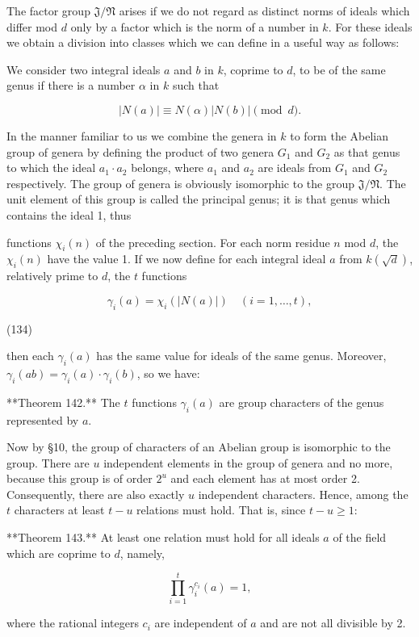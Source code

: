 The factor group $\mathfrak{J}/\mathfrak{N}$ arises if we do not regard as distinct norms of ideals which differ mod $d$ only by a factor which is the norm of a number in $k$. For these ideals we obtain a division into classes which we can define in a useful way as follows:

We consider two integral ideals $a$ and $b$ in $k$, coprime to $d$, to be of the same genus if there is a number $\alpha$ in $k$ such that

$$|N(a)| \equiv N(\alpha)|N(b)| \pmod{d}.$$

In the manner familiar to us we combine the genera in $k$ to form the Abelian group of genera by defining the product of two genera $G_1$ and $G_2$ as that genus to which the ideal $a_1 \cdot a_2$ belongs, where $a_1$ and $a_2$ are ideals from $G_1$ and $G_2$ respectively. The group of genera is obviously isomorphic to the group $\mathfrak{J}/\mathfrak{N}$. The unit element of this group is called the principal genus; it is that genus which contains the ideal 1, thus

functions $\chi_i(n)$ of the preceding section. For each norm residue $n$ mod $d$, the $\chi_i(n)$ have the value 1. If we now define for each integral ideal $a$ from $k(\sqrt{d})$, relatively prime to $d$, the $t$ functions

$$\gamma_i(a) = \chi_i(|N(a)|) \quad (i = 1, \ldots, t),$$

(134)

then each $\gamma_i(a)$ has the same value for ideals of the same genus. Moreover, $\gamma_i(a b) = \gamma_i(a) \cdot \gamma_i(b)$, so we have:

**Theorem 142.** The $t$ functions $\gamma_i(a)$ are group characters of the genus represented by $a$.

Now by §10, the group of characters of an Abelian group is isomorphic to the group. There are $u$ independent elements in the group of genera and no more, because this group is of order $2^u$ and each element has at most order 2. Consequently, there are also exactly $u$ independent characters. Hence, among the $t$ characters at least $t - u$ relations must hold. That is, since $t - u \geq 1$:

**Theorem 143.** At least one relation must hold for all ideals $a$ of the field which are coprime to $d$, namely,

$$\prod_{i=1}^{t} \gamma_i^{c_i}(a) = 1,$$

where the rational integers $c_i$ are independent of $a$ and are not all divisible by 2.

